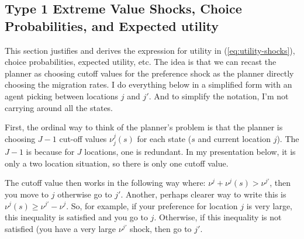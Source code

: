 \documentclass[pdftex,11pt]{article}
\begin{document}
\subsection{Type 1 Extreme Value Shocks, Choice Probabilities, and Expected utility}

This section justifies and derives the expression for utility in (\ref{eq:utility-shocks}), choice probabilities, expected utility, etc. The idea is that we can recast the planner as choosing cutoff values for the preference shock as the planner directly choosing the migration rates. I do everything below in a simplified form with an agent picking between locations $j$ and $j'$. And to simplify the notation, I'm not carrying around all the states.

First, the ordinal way to think of the planner's problem is that the planner is choosing $J-1$ cut-off values $\nu_j^{j}(s)$ for each state ($s$ and current location $j$). The $J-1$ is because for $J$ locations, one is redundant. In my presentation below, it is only a two location situation, so there is only one cutoff value.

The cutoff value then works in the following way where: $\nu^{j} + \nu^{j}(s) > \nu^{j'}$, then you move to $j$ otherwise go to $j'$. Another, perhaps clearer way to write this is $\nu^{j}(s) \geq \nu^{j'} - \nu^{j}$. So, for example, if your preference for location $j$ is very large, this inequality is satisfied and you go to $j$. Otherwise, if this inequality is not satisfied (you have a very large $\nu^{j'}$ shock, then go to $j'$.
\end{document}
